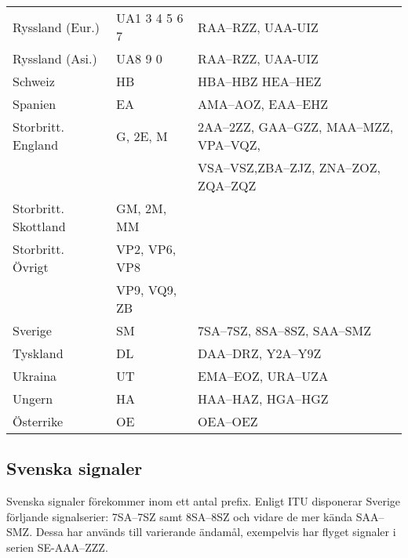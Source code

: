 \begin{center}
\begin{footnotesize}
\begin{longtable}{lll}
			Ryssland (Eur.)      & UA1 3 4 5 6 7  & RAA--RZZ, UAA-UIZ                                 \\
			Ryssland (Asi.)      & UA8 9 0        & RAA--RZZ, UAA-UIZ                                 \\
			Schweiz              & HB             & HBA--HBZ HEA--HEZ                                 \\
			Spanien              & EA             & AMA--AOZ, EAA--EHZ                                \\
			Storbritt. England   & G, 2E, M       & 2AA--2ZZ, GAA--GZZ, MAA--MZZ, VPA--VQZ,           \\
			                     &                & VSA--VSZ,ZBA--ZJZ, ZNA--ZOZ, ZQA--ZQZ             \\
			Storbritt. Skottland & GM, 2M, MM     &                                                   \\
			Storbritt. Övrigt    & VP2, VP6, VP8  &                                                   \\
			                     & VP9, VQ9, ZB   &                                                   \\
			Sverige              & SM             & 7SA--7SZ, 8SA--8SZ, SAA--SMZ                      \\
			Tyskland             & DL             & DAA--DRZ, Y2A--Y9Z                                \\
			Ukraina              & UT             & EMA--EOZ, URA--UZA                                \\
			Ungern               & HA             & HAA--HAZ, HGA--HGZ                                \\
			Österrike            & OE             & OEA--OEZ                                          \\
		\end{longtable}
	\end{footnotesize}
\end{center}

\subsection{Svenska signaler}

Svenska signaler förekommer inom ett antal prefix. Enligt ITU disponerar
Sverige förljande signalserier: 7SA--7SZ samt 8SA--8SZ och vidare de mer kända
SAA--SMZ. Dessa har används till varierande ändamål, exempelvis har flyget
signaler i serien SE-AAA--ZZZ.

